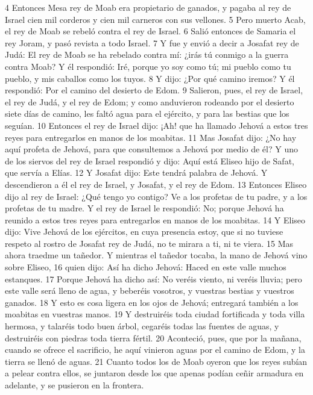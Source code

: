 4 Entonces Mesa rey de Moab era propietario de ganados, y pagaba al rey de Israel cien mil corderos y cien mil carneros con sus vellones.
5 Pero muerto Acab, el rey de Moab se rebeló contra el rey de Israel.
6 Salió entonces de Samaria el rey Joram, y pasó revista a todo Israel.
7 Y fue y envió a decir a Josafat rey de Judá: El rey de Moab se ha rebelado contra mí: ¿irás tú conmigo a la guerra contra Moab? Y él respondió: Iré, porque yo soy como tú; mi pueblo como tu pueblo, y mis caballos como los tuyos.
8 Y dijo: ¿Por qué camino iremos? Y él respondió: Por el camino del desierto de Edom.
9 Salieron, pues, el rey de Israel, el rey de Judá, y el rey de Edom; y como anduvieron rodeando por el desierto siete días de camino, les faltó agua para el ejército, y para las bestias que los seguían.
10 Entonces el rey de Israel dijo: ¡Ah! que ha llamado Jehová a estos tres reyes para entregarlos en manos de los moabitas.
11 Mas Josafat dijo: ¿No hay aquí profeta de Jehová, para que consultemos a Jehová por medio de él? Y uno de los siervos del rey de Israel respondió y dijo: Aquí está Eliseo hijo de Safat, que servía a Elías.
12 Y Josafat dijo: Este tendrá palabra de Jehová. Y descendieron a él el rey de Israel, y Josafat, y el rey de Edom.
13 Entonces Eliseo dijo al rey de Israel: ¿Qué tengo yo contigo? Ve a los profetas de tu padre, y a los profetas de tu madre. Y el rey de Israel le respondió: No; porque Jehová ha reunido a estos tres reyes para entregarlos en manos de los moabitas.
14 Y Eliseo dijo: Vive Jehová de los ejércitos, en cuya presencia estoy, que si no tuviese respeto al rostro de Josafat rey de Judá, no te mirara a ti, ni te viera.
15 Mas ahora traedme un tañedor. Y mientras el tañedor tocaba, la mano de Jehová vino sobre Eliseo,
16 quien dijo: Así ha dicho Jehová: Haced en este valle muchos estanques.
17 Porque Jehová ha dicho así: No veréis viento, ni veréis lluvia; pero este valle será lleno de agua, y beberéis vosotros, y vuestras bestias y vuestros ganados.
18 Y esto es cosa ligera en los ojos de Jehová; entregará también a los moabitas en vuestras manos.
19 Y destruiréis toda ciudad fortificada y toda villa hermosa, y talaréis todo buen árbol, cegaréis todas las fuentes de aguas, y destruiréis con piedras toda tierra fértil.
20 Aconteció, pues, que por la mañana, cuando se ofrece el sacrificio, he aquí vinieron aguas por el camino de Edom, y la tierra se llenó de aguas.
21 Cuanto todos los de Moab oyeron que los reyes subían a pelear contra ellos, se juntaron desde los que apenas podían ceñir armadura en adelante, y se pusieron en la frontera.

